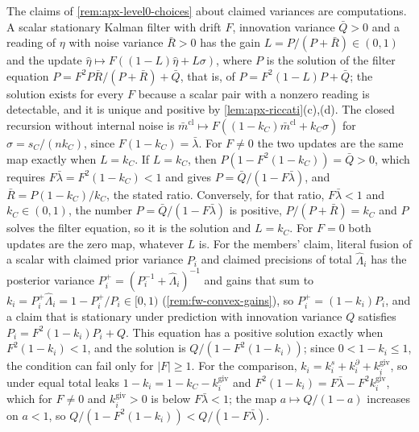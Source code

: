 The claims of \cref{rem:apx-level0-choices} about claimed variances are computations. A scalar stationary Kalman filter with drift $F$, innovation variance $\bar Q>0$ and a reading of $\eta$ with noise variance $\bar R>0$ has the gain $L=P/(P+\bar R)\in(0,1)$ and the update $\hat\eta\mapsto F((1-L)\hat\eta+L\sigma)$, where $P$ is the solution of the filter equation $P=F^2P\bar R/(P+\bar R)+\bar Q$, that is, of $P=F^2(1-L)P+\bar Q$; the solution exists for every $F$ because a scalar pair with a nonzero reading is detectable, and it is unique and positive by \cref{lem:apx-riccati}(c),(d). The closed recursion without internal noise is $\bar m^{\mathrm{cl}}\mapsto F((1-k_C)\bar m^{\mathrm{cl}}+k_C\sigma)$ for $\sigma=s_C/(nk_C)$, since $F(1-k_C)=\bar\lambda$. For $F\ne0$ the two updates are the same map exactly when $L=k_C$. If $L=k_C$, then $P(1-F^2(1-k_C))=\bar Q>0$, which requires $F\bar\lambda=F^2(1-k_C)<1$ and gives $P=\bar Q/(1-F\bar\lambda)$, and $\bar R=P(1-k_C)/k_C$, the stated ratio. Conversely, for that ratio, $F\bar\lambda<1$ and $k_C\in(0,1)$, the number $P=\bar Q/(1-F\bar\lambda)$ is positive, $P/(P+\bar R)=k_C$ and $P$ solves the filter equation, so it is the solution and $L=k_C$. For $F=0$ both updates are the zero map, whatever $L$ is. For the members' claim, literal fusion of a scalar with claimed prior variance $P_i$ and claimed precisions of total $\hat\Lambda_i$ has the posterior variance $P^+_i=(P_i^{-1}+\hat\Lambda_i)^{-1}$ and gains that sum to $k_i=P^+_i\hat\Lambda_i=1-P^+_i/P_i\in[0,1)$ (\cref{rem:fw-convex-gains}), so $P^+_i=(1-k_i)P_i$, and a claim that is stationary under prediction with innovation variance $Q$ satisfies $P_i=F^2(1-k_i)P_i+Q$. This equation has a positive solution exactly when $F^2(1-k_i)<1$, and the solution is $Q/(1-F^2(1-k_i))$; since $0<1-k_i\le1$, the condition can fail only for $\lvert F\rvert\ge1$. For the comparison, $k_i=k^s_i+k^\partial_i+k^{\mathrm{giv}}_i$, so under equal total leaks $1-k_i=1-k_C-k^{\mathrm{giv}}_i$ and $F^2(1-k_i)=F\bar\lambda-F^2k^{\mathrm{giv}}_i$, which for $F\ne0$ and $k^{\mathrm{giv}}_i>0$ is below $F\bar\lambda<1$; the map $a\mapsto Q/(1-a)$ increases on $a<1$, so $Q/(1-F^2(1-k_i))<Q/(1-F\bar\lambda)$.

